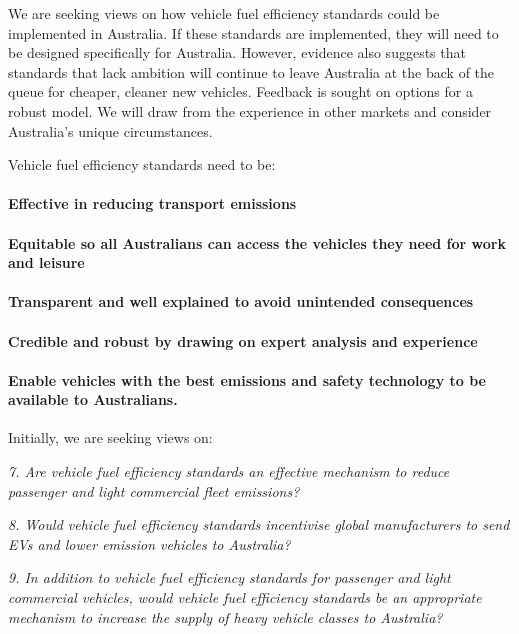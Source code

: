 \documentclass[12pt, draft]{article} \usepackage[shortlabels]{enumitem}
\begin{document}
We are seeking views on how vehicle fuel efficiency standards could be
implemented in Australia. If these standards are implemented, they will need to
be designed specifically for Australia. However, evidence also suggests that
standards that lack ambition will continue to leave Australia at the back of
the queue for cheaper, cleaner new vehicles. Feedback is sought on options for
a robust model. We will draw from the experience in other markets and consider
Australia’s unique circumstances.

Vehicle fuel efficiency standards need to be:

\paragraph{Effective in reducing transport emissions}

\paragraph{Equitable so all Australians can access the vehicles they need for work and
leisure}

\paragraph{Transparent and well explained to avoid unintended consequences}

\paragraph{Credible and robust by drawing on expert analysis and experience}

\paragraph{Enable vehicles with the best emissions and safety technology to be available
to Australians.} 

Initially, we are seeking views on:

\emph{7. Are vehicle fuel efficiency standards an effective mechanism to reduce
passenger and light commercial fleet emissions?}

\emph{8. Would vehicle fuel efficiency standards incentivise global manufacturers to
send EVs and lower emission vehicles to Australia?}

\emph{9. In addition to vehicle fuel efficiency standards for passenger and light
commercial vehicles, would vehicle fuel efficiency standards be an appropriate
mechanism to increase the supply of heavy vehicle classes to Australia?}
\end{document}
